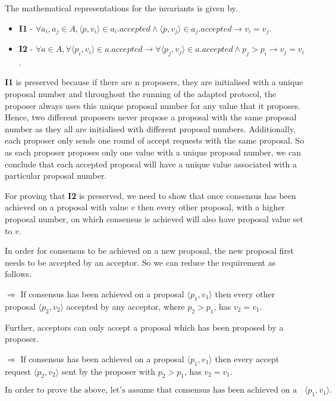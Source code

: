 The mathematical representations for the invariants is given by.
\begin{itemize}
  \item \textbf{I1} - $\forall a_i, a_j \in A, \langle p, v_i \rangle \in a_{i}.accepted
  \land \langle p, v_j \rangle \in a_{j}.accepted \rightarrow v_i = v_j$.
  \item \textbf{I2} - $\forall a \in A, \forall \langle p_i, v_i \rangle \in a.accepted
    \rightarrow \forall \langle p_j, v_j \rangle \in  a.accepted \land p_j > p_i
    \rightarrow v_j = v_i$.
\end{itemize}

\textbf{I1} is preserved because if there are n proposers, they are
initialised with a unique proposal number and throughout the running of the
adapted protocol, the proposer always uses this unique proposal number for any
value that it proposes. Hence, two different proposers never propose a proposal
with the same proposal number as they all are initialised with different
proposal numbers. Additionally, each proposer only sends one round
of accept requests with the same proposal. So as each proposer proposes only one
value with a unique proposal number, we can conclude that each accepted proposal
will have a unique value associated with a particular proposal number.

For proving that \textbf{I2} is preserved, we need to show that once consensus
has been achieved
on a proposal with value $v$ then every other proposal, with a higher
proposal number, on which consensus is achieved will also have
proposal value set to $v$.

In order for consensus to be achieved on a new proposal, the new
proposal first needs to be accepted by an acceptor.
So we can reduce the requirement as follows.

$\Rightarrow$ If consensus has been achieved on a proposal
$\langle p_1, v_1 \rangle$ then every other proposal $\langle p_2, v_2 \rangle$
accepted by any acceptor, where $p_2 > p_1$, has $v_2 = v_1$.

Further, acceptors can only accept a proposal which has been proposed
by a proposer.

$\Rightarrow$ If consensus has been achieved on a proposal $\langle p_1, v_1 \rangle$
then every accept request $\langle p_2, v_2 \rangle$ sent by the proposer with
$p_2 > p_1$, has $v_2 = v_1$.

\begin{equation}
\textrm{In order to prove the above, let's assume that consensus has been
achieved on a proposal} \langle p_1, v_1 \rangle.
\end{equation}

